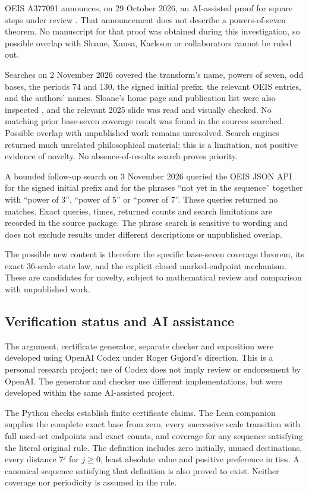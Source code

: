 \documentclass[11pt,a4paper]{article}
\begin{document}
OEIS A377091 announces, on 29 October 2026, an AI-assisted proof for square steps under review \cite{ref3}. That announcement does not describe a powers-of-seven theorem. No manuscript for that proof was obtained during this investigation, so possible overlap with Sloane, Xausa, Karlsson or collaborators cannot be ruled out.

Searches on 2 November 2026 covered the transform's name, powers of seven, odd bases, the periods 74 and 130, the signed initial prefix, the relevant OEIS entries, and the authors' names. Sloane's home page and publication list were also inspected \cite{ref5,ref6}, and the relevant 2025 slide was read and visually checked. No matching prior base-seven coverage result was found in the sources searched. Possible overlap with unpublished work remains unresolved. Search engines returned much unrelated philosophical material; this is a limitation, not positive evidence of novelty. No absence-of-results search proves priority.

A bounded follow-up search on 3 November 2026 queried the OEIS JSON API
for the signed initial prefix and for the phrases ``not yet in the
sequence'' together with ``power of 3'', ``power of 5'' or ``power of 7''.
These queries returned no matches. Exact queries, times, returned counts and search limitations are
recorded in the source package. The phrase search is sensitive to wording
and does not exclude results under different descriptions or unpublished
overlap.

The possible new content is therefore the specific base-seven coverage theorem, its exact 36-scale state law, and the explicit closed marked-endpoint mechanism. These are candidates for novelty, subject to mathematical review and comparison with unpublished work.

\begin{samepage}
\section*{Verification status and AI assistance}
The argument, certificate generator, separate checker and exposition were
developed using OpenAI Codex under Roger Gujord's direction. This is a
personal research project; use of Codex does not imply review or endorsement
by OpenAI. The generator and checker use different implementations, but
were developed within the same AI-assisted project.
\end{samepage}

The Python checks establish finite certificate claims. The Lean companion
supplies the complete exact base from zero, every successive scale
transition with full used-set endpoints and exact counts, and coverage for
any sequence satisfying the literal original rule. The definition includes
zero initially, unused destinations, every distance $7^j$ for $j\ge0$,
least absolute value and positive preference in ties. A canonical sequence
satisfying that definition is also proved to exist. Neither coverage nor
periodicity is assumed in the rule.
\end{document}
